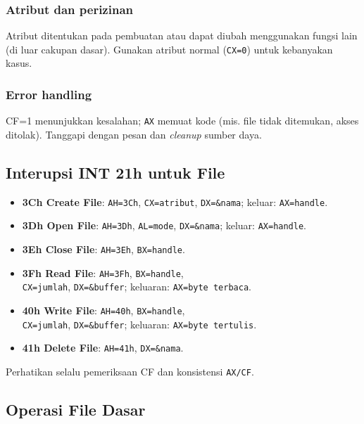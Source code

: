 \documentclass[../main.tex]{subfiles}
\begin{document}
        \subsubsection{Atribut dan perizinan}
            Atribut ditentukan pada pembuatan atau dapat diubah menggunakan fungsi lain (di luar cakupan dasar). Gunakan atribut normal (\texttt{CX=0}) untuk kebanyakan kasus.

        \subsubsection{Error handling}
            CF=1 menunjukkan kesalahan; \texttt{AX} memuat kode (mis. file tidak ditemukan, akses ditolak). Tanggapi dengan pesan dan \textit{cleanup} sumber daya.

        \subsection{Interupsi INT 21h untuk File}
            \begin{itemize}
                \item \textbf{3Ch Create File}: \texttt{AH=3Ch}, \texttt{CX=atribut}, \texttt{DX=\&nama}; keluar: \texttt{AX=handle}.
                \item \textbf{3Dh Open File}: \texttt{AH=3Dh}, \texttt{AL=mode}, \texttt{DX=\&nama}; keluar: \texttt{AX=handle}.
                \item \textbf{3Eh Close File}: \texttt{AH=3Eh}, \texttt{BX=handle}.
                \item \textbf{3Fh Read File}: \texttt{AH=3Fh}, \texttt{BX=handle}, \\
                \texttt{CX=jumlah}, \texttt{DX=\&buffer}; keluaran: \texttt{AX=byte terbaca}.
                \item \textbf{40h Write File}: \texttt{AH=40h}, \texttt{BX=handle}, \\
                \texttt{CX=jumlah}, \texttt{DX=\&buffer}; keluaran: \texttt{AX=byte tertulis}.
                \item \textbf{41h Delete File}: \texttt{AH=41h}, \texttt{DX=\&nama}.
            \end{itemize}
            Perhatikan selalu pemeriksaan CF dan konsistensi \texttt{AX/CF}.

        \subsection{Operasi File Dasar}
\end{document}
